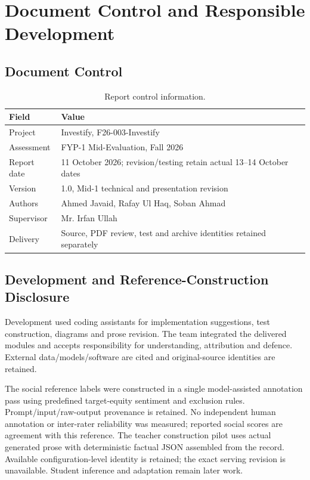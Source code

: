 \chapter{Document Control and Responsible Development}
\label{app:handbook}
\section{Document Control}
\begin{longtable}{p{}p{}}
\caption{Report control information.}\label{tab:document-control}\\\toprule Field & Value\\\midrule
Project & Investify, F26-003-Investify\\
Assessment & FYP-1 Mid-Evaluation, Fall 2026\\
Report date & 11 October 2026; revision/testing retain actual 13--14 October dates\\
Version & 1.0, Mid-1 technical and presentation revision\\
Authors & Ahmed Javaid, Rafay Ul Haq, Soban Ahmad\\
Supervisor & Mr. Irfan Ullah\\
Delivery & Source, PDF review, test and archive identities retained separately\\
\bottomrule\end{longtable}
\section{Development and Reference-Construction Disclosure}
Development used coding assistants for implementation suggestions, test construction, diagrams and prose revision. The team integrated the delivered modules and accepts responsibility for understanding, attribution and defence. External data/models/software are cited and original-source identities are retained.

The social reference labels were constructed in a single model-assisted annotation pass using predefined target-equity sentiment and exclusion rules. Prompt/input/raw-output provenance is retained. No independent human annotation or inter-rater reliability was measured; reported social scores are agreement with this reference. The teacher construction pilot uses actual generated prose with deterministic factual JSON assembled from the record. Available configuration-level identity is retained; the exact serving revision is unavailable. Student inference and adaptation remain later work.
